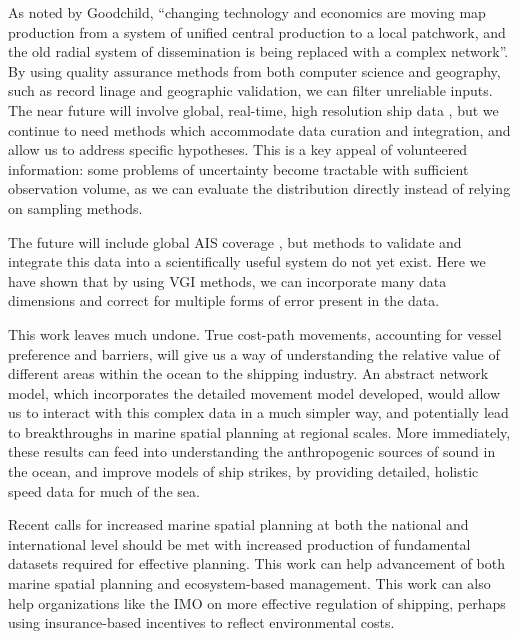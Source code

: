 

As noted by Goodchild, ``changing technology and economics are moving map production from a system of unified central production to a local patchwork, and the old radial system of dissemination is being replaced with a complex network''\citep{goodchild1999cartographic}. By using quality assurance methods from both computer science and geography, such as record linage and geographic validation, we can filter unreliable inputs. The near future will involve global, real-time, high resolution ship data \citep{JonesGoogle2012,carson2012satellite}, but we continue to need methods which accommodate data curation and integration, and allow us to address specific hypotheses. This is a key appeal of volunteered information: some problems of uncertainty become tractable with sufficient observation volume, as we can evaluate the distribution directly instead of relying on sampling methods.


The future will include global AIS coverage \citep{JonesGoogle2012,carson2012satellite}, but methods to validate and integrate this data into a scientifically useful system do not yet exist. Here we have shown that by using VGI methods, we can incorporate many data dimensions and correct for multiple forms of error present in the data.

This work leaves much undone. True cost-path movements, accounting for vessel preference and barriers, will give us a way of understanding the relative value of different areas within the ocean to the shipping industry. An abstract network model, which incorporates the detailed movement model developed, would allow us to interact with this complex data in a much simpler way, and potentially lead to breakthroughs in marine spatial planning at regional scales. More immediately, these results can feed into understanding the anthropogenic sources of sound in the ocean, and improve models of ship strikes, by providing detailed, holistic speed data for much of the sea.

Recent calls for increased marine spatial planning at both the national and international level should be met with increased production of fundamental datasets required for effective planning. This work can help advancement of both marine spatial planning and ecosystem-based management. This work can also help organizations like the IMO on more effective regulation of shipping, perhaps using insurance-based incentives to reflect environmental costs.



